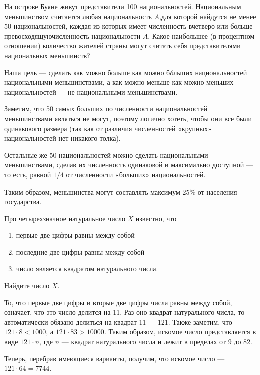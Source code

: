
\begin{itemize}

	\itB На острове Буяне живут представители 100 национальностей. Национальным меньшинством считается любая национальность $A$,\linebreak для которой найдутся не менее 50 национальностей, каждая из которых имеет численность вчетверо или больше превосходящую\linebreak численность национальности $A$. Какое наибольшее (в процентном отношении) количество жителей страны могут считать себя представителями национальных меньшинств?
	
	\itr Наша цель — сделать как можно больше как можно б\'oльших национальностей национальными меньшинствами, а как можно меньше как можно меньших национальностей — не национальными меньшинствами.
	
	Заметим, что 50 самых больших по численности национальностей меньшинствами являться не могут, поэтому логично хотеть, чтобы они все были одинакового размера (так как от различия численностей «крупных» национальностей нет никакого толка).
	
	Остальные же 50 национальностей можно сделать национальными меньшинствами, сделав их численность одинаковой и максимально доступной — то есть, равной $1/4$ от численности «больших» национальностей.
	
	Таким образом, меньшинства могут составлять максимум $25\%$ от населения государства.

	\itC Про четырехзначное натуральное число $X$ известно, что
	
	\begin{enumerate}[label=\arabic*)]
		\item первые две цифры равны между собой\scolon
		\item последние две цифры равны между собой\scolon
		\item число является квадратом натурального числа.
	\end{enumerate}
	
	Найдите число $X$.
	
	\itr То, что первые две цифры и вторые две цифры числа равны между собой, означает, что это число делится на 11. Раз оно квадрат натурального числа, то автоматически обязано делиться на квадрат 11 — 121. Также заметим, что $121 \cdot 8 < 1000$, а $121 \cdot 83 > 10000$. Таким образом, искомое число представляется в виде $121 \cdot n$, где $n$ — квадрат натурального числа и лежит в пределах от 9 до 82.
	
	Теперь, перебрав имеющиеся варианты, получим, что искомое число — $121 \cdot 64 = 7744$.
	
\end{itemize}